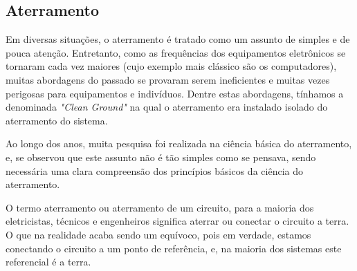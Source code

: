 \subsection{Aterramento} \label{subsection: grounding}

Em diversas situações, o aterramento é tratado como um assunto de simples e de pouca atenção. Entretanto, como as frequências dos equipamentos eletrônicos se tornaram cada vez maiores (cujo exemplo mais clássico são os computadores), muitas abordagens do passado se provaram serem ineficientes e muitas vezes perigosas para equipamentos e indivíduos. Dentre estas abordagens, tínhamos a denominada \textit{"Clean Ground"} na qual o aterramento era instalado isolado do aterramento do sistema.

Ao longo dos anos, muita pesquisa foi realizada na ciência básica do aterramento, e, se observou que este assunto não é tão simples como se pensava, sendo necessária uma clara compreensão dos princípios básicos da ciência do aterramento.

O termo aterramento ou aterramento de um circuito, para a maioria dos eletricistas, técnicos e engenheiros significa aterrar ou conectar o circuito a terra. O que na realidade acaba sendo um equívoco, pois em verdade, estamos conectando o circuito a um ponto de referência, e, na maioria dos sistemas este referencial é a terra.

%

%

%
